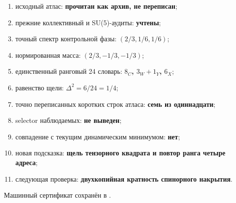 \begin{protocol}
\begin{enumerate}
 \item исходный атлас: \textbf{прочитан как архив, не переписан};
 \item прежние коллективный и SU(5)-аудиты: \textbf{учтены};
 \item точный спектр контрольной фазы: \textbf{$(2/3,1/6,1/6)$};
 \item нормированная масса: \textbf{$(2/3,-1/3,-1/3)$};
 \item единственный ранговый 24 словарь: \textbf{$8_C$, $3_W+1_Y$, $6_X$};
 \item равенство щели: \textbf{$\Delta^2=6/24=1/4$};
 \item точно переписанных коротких строк атласа: \textbf{семь из одиннадцати};
 \item selector наблюдаемых: \textbf{не выведен};
 \item совпадение с текущим динамическим минимумом: \textbf{нет};
 \item новая подсказка: \textbf{щель тензорного квадрата и повтор ранга четыре адреса};
 \item следующая проверка: \textbf{двухкопийная кратность спинорного накрытия}.
\end{enumerate}
\end{protocol}

Машинный сертификат сохранён в
.